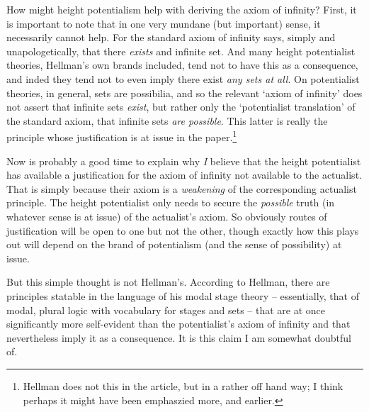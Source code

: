 \documentclass{asl}
\theoremstyle{definition}
\begin{document}
How might height potentialism help with deriving the axiom of infinity? 
First, it is important to note that in one very mundane (but important) sense,
it necessarily cannot help. For the standard axiom of infinity says, 
simply and unapologetically, 
that there \emph{exists} and infinite set. And many height potentialist theories, 
Hellman's own brands included, 
tend not to have this as a consequence, and inded they tend not 
to even imply there exist \emph{any sets at all}. 
On potentialist theories, in general, sets are possibilia, 
and so the relevant `axiom of infinity' does not assert that 
infinite sets \emph{exist}, but rather 
only the `potentialist translation' of the standard axiom, 
that infinite sets \emph{are possible}. 
This latter is really the principle 
whose justification is at issue in the paper.\footnote{ 
    Hellman does not this in the article, but in a rather off hand way;
    I think perhaps it might have been emphaszied more, and earlier.
    }

Now is probably a good time to explain why 
\emph{I} 
believe that the height potentialist 
has available a justification for the axiom of infinity 
not available to the actualist. 
That is simply because their axiom is a 
\emph{ weakening } 
of the corresponding actualist principle. 
The height potentialist only needs to secure the 
\emph{possible} 
truth 
(in whatever sense is at issue) 
of the actualist's axiom. So obviously routes of justification 
will be open to one but not the other, though exactly how this plays out 
will depend on the brand of potentialism (and the sense of possibility) at issue.

But this simple thought is not Hellman's. 
According to Hellman, 
there are principles statable in the language of his modal stage theory 
-- essentially, that of modal, plural logic with 
vocabulary for stages and sets --
that are at once significantly more self-evident
than the potentialist's axiom of infinity 
and that nevertheless imply it as a consequence. 
It is this claim I am somewhat doubtful of.
\end{document}
